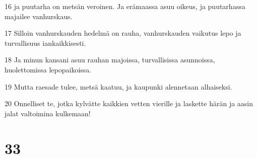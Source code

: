 \par 16 ja puutarha on metsän veroinen. Ja erämaassa asuu oikeus, ja puutarhassa majailee vanhurskaus.
\par 17 Silloin vanhurskauden hedelmä on rauha, vanhurskauden vaikutus lepo ja turvallisuus iankaikkisesti.
\par 18 Ja minun kansani asuu rauhan majoissa, turvallisissa asunnoissa, huolettomissa lepopaikoissa.
\par 19 Mutta raesade tulee, metsä kaatuu, ja kaupunki alennetaan alhaiseksi.
\par 20 Onnelliset te, jotka kylvätte kaikkien vetten vierille ja laskette härän ja aasin jalat valtoimina kulkemaan!

\chapter{33}


